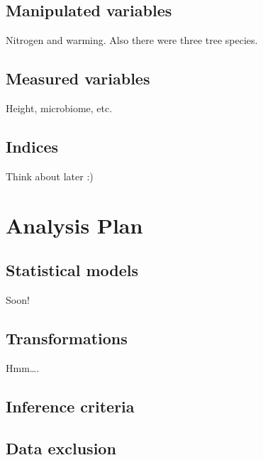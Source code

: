 \documentclass[]{article}
\begin{document}
\hypertarget{manipulated-variables}{%
\subsection{Manipulated variables}\label{manipulated-variables}}

Nitrogen and warming. Also there were three tree species.

\hypertarget{measured-variables}{%
\subsection{Measured variables}\label{measured-variables}}

Height, microbiome, etc.

\hypertarget{indices}{%
\subsection{Indices}\label{indices}}

Think about later :)

\hypertarget{analysis-plan}{%
\section{Analysis Plan}\label{analysis-plan}}

\hypertarget{statistical-models}{%
\subsection{Statistical models}\label{statistical-models}}

Soon!

\hypertarget{transformations}{%
\subsection{Transformations}\label{transformations}}

Hmm\ldots.

\hypertarget{inference-criteria}{%
\subsection{Inference criteria}\label{inference-criteria}}

\hypertarget{data-exclusion}{%
\subsection{Data exclusion}\label{data-exclusion}}
\end{document}
